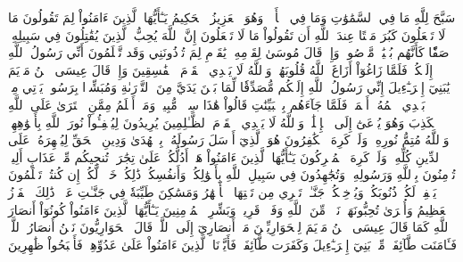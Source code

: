 سَبَّحَ لِلَّهِ مَا فِي ٱلسَّمَٰوَٰتِ وَمَا فِي ٱلۡأَرۡضِۖ وَهُوَ ٱلۡعَزِيزُ ٱلۡحَكِيمُ
يَـٰٓأَيُّهَا ٱلَّذِينَ ءَامَنُواْ لِمَ تَقُولُونَ مَا لَا تَفۡعَلُونَ
كَبُرَ مَقۡتًا عِندَ ٱللَّهِ أَن تَقُولُواْ مَا لَا تَفۡعَلُونَ
إِنَّ ٱللَّهَ يُحِبُّ ٱلَّذِينَ يُقَٰتِلُونَ فِي سَبِيلِهِۦ صَفّٗا كَأَنَّهُم بُنۡيَٰنٞ مَّرۡصُوصٞ
وَإِذۡ قَالَ مُوسَىٰ لِقَوۡمِهِۦ يَٰقَوۡمِ لِمَ تُؤۡذُونَنِي وَقَد تَّعۡلَمُونَ أَنِّي رَسُولُ ٱللَّهِ إِلَيۡكُمۡۖ فَلَمَّا زَاغُوٓاْ أَزَاغَ ٱللَّهُ قُلُوبَهُمۡۚ وَٱللَّهُ لَا يَهۡدِي ٱلۡقَوۡمَ ٱلۡفَٰسِقِينَ
وَإِذۡ قَالَ عِيسَى ٱبۡنُ مَرۡيَمَ يَٰبَنِيٓ إِسۡرَـٰٓءِيلَ إِنِّي رَسُولُ ٱللَّهِ إِلَيۡكُم مُّصَدِّقٗا لِّمَا بَيۡنَ يَدَيَّ مِنَ ٱلتَّوۡرَىٰةِ وَمُبَشِّرَۢا بِرَسُولٖ يَأۡتِي مِنۢ بَعۡدِي ٱسۡمُهُۥٓ أَحۡمَدُۖ فَلَمَّا جَآءَهُم بِٱلۡبَيِّنَٰتِ قَالُواْ هَٰذَا سِحۡرٞ مُّبِينٞ
وَمَنۡ أَظۡلَمُ مِمَّنِ ٱفۡتَرَىٰ عَلَى ٱللَّهِ ٱلۡكَذِبَ وَهُوَ يُدۡعَىٰٓ إِلَى ٱلۡإِسۡلَٰمِۚ وَٱللَّهُ لَا يَهۡدِي ٱلۡقَوۡمَ ٱلظَّـٰلِمِينَ
يُرِيدُونَ لِيُطۡفِـُٔواْ نُورَ ٱللَّهِ بِأَفۡوَٰهِهِمۡ وَٱللَّهُ مُتِمُّ نُورِهِۦ وَلَوۡ كَرِهَ ٱلۡكَٰفِرُونَ
هُوَ ٱلَّذِيٓ أَرۡسَلَ رَسُولَهُۥ بِٱلۡهُدَىٰ وَدِينِ ٱلۡحَقِّ لِيُظۡهِرَهُۥ عَلَى ٱلدِّينِ كُلِّهِۦ وَلَوۡ كَرِهَ ٱلۡمُشۡرِكُونَ
يَـٰٓأَيُّهَا ٱلَّذِينَ ءَامَنُواْ هَلۡ أَدُلُّكُمۡ عَلَىٰ تِجَٰرَةٖ تُنجِيكُم مِّنۡ عَذَابٍ أَلِيمٖ
تُؤۡمِنُونَ بِٱللَّهِ وَرَسُولِهِۦ وَتُجَٰهِدُونَ فِي سَبِيلِ ٱللَّهِ بِأَمۡوَٰلِكُمۡ وَأَنفُسِكُمۡۚ ذَٰلِكُمۡ خَيۡرٞ لَّكُمۡ إِن كُنتُمۡ تَعۡلَمُونَ
يَغۡفِرۡ لَكُمۡ ذُنُوبَكُمۡ وَيُدۡخِلۡكُمۡ جَنَّـٰتٖ تَجۡرِي مِن تَحۡتِهَا ٱلۡأَنۡهَٰرُ وَمَسَٰكِنَ طَيِّبَةٗ فِي جَنَّـٰتِ عَدۡنٖۚ ذَٰلِكَ ٱلۡفَوۡزُ ٱلۡعَظِيمُ
وَأُخۡرَىٰ تُحِبُّونَهَاۖ نَصۡرٞ مِّنَ ٱللَّهِ وَفَتۡحٞ قَرِيبٞۗ وَبَشِّرِ ٱلۡمُؤۡمِنِينَ
يَـٰٓأَيُّهَا ٱلَّذِينَ ءَامَنُواْ كُونُوٓاْ أَنصَارَ ٱللَّهِ كَمَا قَالَ عِيسَى ٱبۡنُ مَرۡيَمَ لِلۡحَوَارِيِّـۧنَ مَنۡ أَنصَارِيٓ إِلَى ٱللَّهِۖ قَالَ ٱلۡحَوَارِيُّونَ نَحۡنُ أَنصَارُ ٱللَّهِۖ فَـَٔامَنَت طَّآئِفَةٞ مِّنۢ بَنِيٓ إِسۡرَـٰٓءِيلَ وَكَفَرَت طَّآئِفَةٞۖ فَأَيَّدۡنَا ٱلَّذِينَ ءَامَنُواْ عَلَىٰ عَدُوِّهِمۡ فَأَصۡبَحُواْ ظَٰهِرِينَ